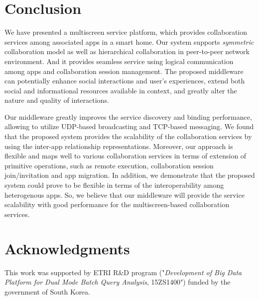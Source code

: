 \documentclass[conference]{IEEEtran}
\begin{document}
\section{Conclusion}
    \label{sc:Conclusion}
We have presented a multiscreen service platform, which provides collaboration services among associated apps in a smart home. 
Our system supports \textit{symmetric} collaboration model as well as hierarchical collaboration in peer-to-peer network environment.
And it provides seamless service using logical communication among apps and collaboration session management.
The proposed middleware can potentially enhance social interactions and user's experiences, extend both social and informational resources available in context, and greatly alter the nature and quality of interactions.

Our middleware greatly improves the service discovery and binding performance, allowing to utilize UDP-based broadcasting and TCP-based messaging.
We found that the proposed system provides the scalability of the collaboration services by using the inter-app relationship representations.
Moreover, our approach is flexible and maps well to various collaboration services in terms of extension of primitive operations, such as remote execution, collaboration session join/invitation and app migration.
In addition, we demonstrate that the proposed system could prove to be flexible in terms of the interoperability among heterogenous apps. 
So, we believe that our middleware will provide the service scalability with good performance for the multiscreen-based collaboration services.

\section*{Acknowledgments}
This work was supported by ETRI R\&D program ("\textit{Development of Big Data Platform for Dual Mode Batch Query Analysis}, 15ZS1400")
funded by the government of South Korea.

%

\end{document}
